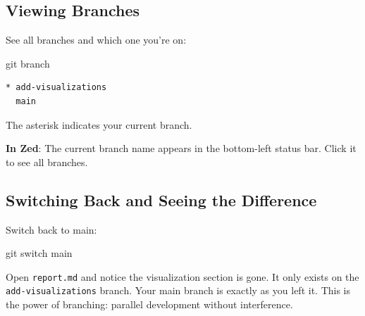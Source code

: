 \documentclass[
  letterpaper,
  DIV=11,
  numbers=noendperiod]{scrreprt}
\newenvironment{Shaded}{\begin{snugshade}}{\end{snugshade}}
\newcommand{\FunctionTok}[1]{\textcolor[rgb]{0.28,0.35,0.67}{#1}}
\newcommand{\NormalTok}[1]{\textcolor[rgb]{0.00,0.23,0.31}{#1}}
\begin{document}
\subsection{Viewing Branches}\label{viewing-branches}

See all branches and which one you're on:

\begin{codelisting}

\caption{\texttt{terminal}}

\begin{Shaded}
\begin{Highlighting}[]
\FunctionTok{git}\NormalTok{ branch}
\end{Highlighting}
\end{Shaded}

\end{codelisting}

\begin{verbatim}
* add-visualizations
  main
\end{verbatim}

The asterisk indicates your current branch.

\textbf{In Zed}: The current branch name appears in the bottom-left
status bar. Click it to see all branches.

\subsection{Switching Back and Seeing the
Difference}\label{switching-back-and-seeing-the-difference}

Switch back to main:

\begin{codelisting}

\caption{\texttt{terminal}}

\begin{Shaded}
\begin{Highlighting}[]
\FunctionTok{git}\NormalTok{ switch main}
\end{Highlighting}
\end{Shaded}

\end{codelisting}

Open \texttt{report.md} and notice the visualization section is gone. It
only exists on the \texttt{add-visualizations} branch. Your main branch
is exactly as you left it. This is the power of branching: parallel
development without interference.
\end{document}
